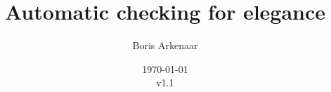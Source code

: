 \documentclass{article}
\begin{document}
 

\title{Automatic checking for elegance}
\author{Boris Arkenaar}
\date{\today\\v1.1}
\maketitle 





\printglossaries
\end{document}
